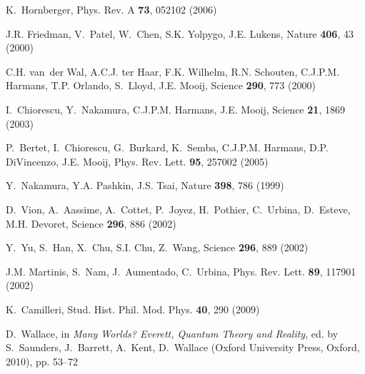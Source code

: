 \documentclass[aps,pra,reprint,amsmath,amssymb,showpacs,nofootinbib,floatfix,onecolumn,12pt]{revtex4-1}
\begin{document}
\begin{thebibliography}{100}
K.~Hornberger, Phys. Rev. A \textbf{73}, 052102 (2006)

J.R. Friedman, V.~Patel, W.~Chen, S.K. Yolpygo, J.E. Lukens, Nature
  \textbf{406}, 43 (2000)

C.H. van~der Wal, A.C.J. ter Haar, F.K. Wilhelm, R.N. Schouten, C.J.P.M.
  Harmans, T.P. Orlando, S.~Lloyd, J.E. Mooij, Science \textbf{290}, 773 (2000)

I.~Chiorescu, Y.~Nakamura, C.J.P.M. Harmans, J.E. Mooij, Science \textbf{21},
  1869 (2003)

P.~Bertet, I.~Chiorescu, G.~Burkard, K.~Semba, C.J.P.M. Harmans, D.P.
  DiVincenzo, J.E. Mooij, Phys. Rev. Lett. \textbf{95}, 257002 (2005)

Y.~Nakamura, Y.A. Pashkin, J.S. Tsai, Nature \textbf{398}, 786 (1999)

D.~Vion, A.~Aassime, A.~Cottet, P.~Joyez, H.~Pothier, C.~Urbina, D.~Esteve,
  M.H. Devoret, Science \textbf{296}, 886 (2002)

Y.~Yu, S.~Han, X.~Chu, S.I. Chu, Z.~Wang, Science \textbf{296}, 889 (2002)

J.M. Martinis, S.~Nam, J.~Aumentado, C.~Urbina, Phys. Rev. Lett. \textbf{89},
  117901 (2002)

K.~Camilleri, Stud. Hist. Phil. Mod. Phys. \textbf{40}, 290 (2009)

D.~Wallace, in \emph{Many Worlds? {E}verett, Quantum Theory and Reality}, ed.
  by S.~Saunders, J.~Barrett, A.~Kent, D.~Wallace (Oxford University Press,
  Oxford, 2010), pp. 53--72

\end{thebibliography}
\end{document}
